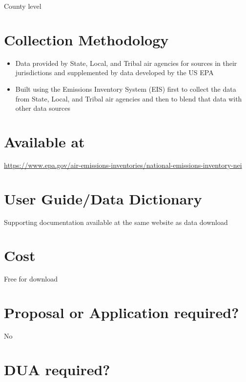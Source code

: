 \documentclass[
]{book}
\providecommand{\tightlist}{%
  \setlength{\itemsep}{0pt}\setlength{\parskip}{0pt}}
\begin{document}
County level

\hypertarget{collection-methodology-46}{%
\section{Collection Methodology}\label{collection-methodology-46}}

\begin{itemize}
\tightlist
\item
  Data provided by State, Local, and Tribal air agencies for sources in their jurisdictions and supplemented by data developed by the US EPA
\item
  Built using the Emissions Inventory System (EIS) first to collect the data from State, Local, and Tribal air agencies and then to blend that data with other data sources
\end{itemize}

\hypertarget{available-at-46}{%
\section{Available at}\label{available-at-46}}

\url{https://www.epa.gov/air-emissions-inventories/national-emissions-inventory-nei}

\hypertarget{user-guidedata-dictionary-46}{%
\section{User Guide/Data Dictionary}\label{user-guidedata-dictionary-46}}

Supporting documentation available at the same website as data download

\hypertarget{cost-46}{%
\section{Cost}\label{cost-46}}

Free for download

\hypertarget{proposal-or-application-required-46}{%
\section{Proposal or Application required?}\label{proposal-or-application-required-46}}

No

\hypertarget{dua-required-46}{%
\section{DUA required?}\label{dua-required-46}}
\end{document}
